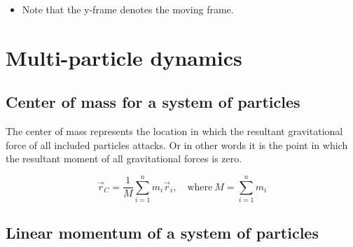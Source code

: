 \documentclass[10pt,a4paper]{scrartcl}
\begin{document}
\begin{multicols*}{2}

\begin{itemize}
\item Note that the y-frame denotes the moving frame.
\end{itemize}

\section{Multi-particle dynamics}

\subsection{Center of mass for a system of particles}

The center of mass represents the location in which the resultant gravitational force of all included particles attacks. Or in other words it is the point in which the resultant moment of all gravitational forces is zero.

\begin{equation*}
\vec{r}_C=\frac{1}{M}\sum\limits_{i=1}^n m_i\vec{r}_i,\quad \text{where}\ M=\sum\limits_{i=1}^n m_i
\end{equation*}


\subsection{Linear momentum of a system of particles}


\end{multicols*}
\end{document}
